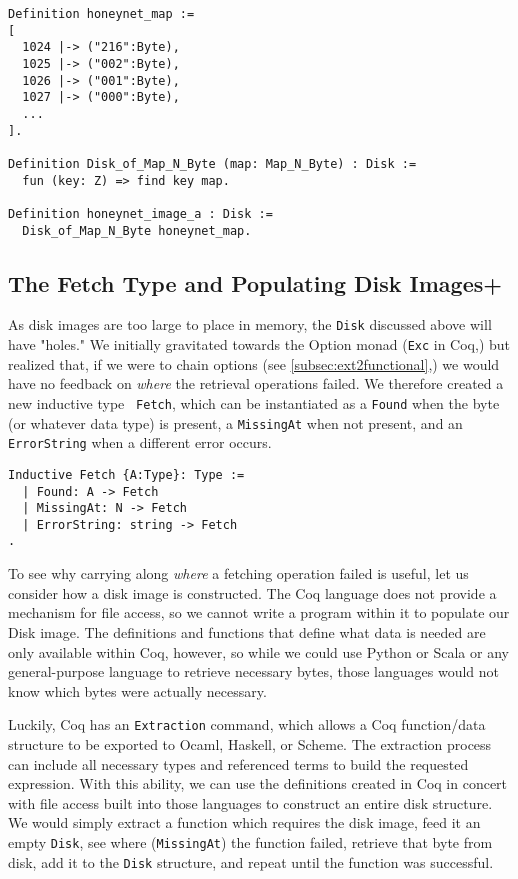 \documentclass[nocopyrightspace]{sigplanconf}
\begin{document}
\begin{lstlisting}
Definition honeynet_map := 
[ 
  1024 |-> ("216":Byte), 
  1025 |-> ("002":Byte),
  1026 |-> ("001":Byte), 
  1027 |-> ("000":Byte), 
  ...
].

Definition Disk_of_Map_N_Byte (map: Map_N_Byte) : Disk :=
  fun (key: Z) => find key map.

Definition honeynet_image_a : Disk := 
  Disk_of_Map_N_Byte honeynet_map.
\end{lstlisting}

\subsection{The Fetch Type and Populating Disk Images+}
\label{subsec:fetch}

As disk images are too large to place in memory, the {\tt Disk} discussed
above will have "holes." We initially gravitated towards the Option monad
({\tt Exc} in Coq,) but realized that, if we were to chain options (see
\ref{subsec:ext2functional},) we would have no feedback on {\em where} the
retrieval operations failed. We therefore created a new inductive type {\tt
Fetch}, which can be instantiated as a {\tt Found} when the byte (or whatever
data type) is present, a {\tt MissingAt} when not present, and an {\tt
ErrorString} when a different error occurs.

\begin{lstlisting}
Inductive Fetch {A:Type}: Type :=
  | Found: A -> Fetch
  | MissingAt: N -> Fetch
  | ErrorString: string -> Fetch
.
\end{lstlisting}

To see why carrying along {\em where} a fetching operation failed is useful,
let us consider how a disk image is constructed. The Coq language does not
provide a mechanism for file access, so we cannot write a program within it to
populate our Disk image. The definitions and functions that define what data
is needed are only available within Coq, however, so while we could use Python
or Scala or any general-purpose language to retrieve necessary bytes, those
languages would not know which bytes were actually necessary.

Luckily, Coq has an {\tt Extraction} command, which allows a Coq function/data
structure to be exported to Ocaml, Haskell, or Scheme. The extraction process
can include all necessary types and referenced terms to build the requested
expression. With this ability, we can use the definitions created in Coq in
concert with file access built into those languages to construct an entire
disk structure. We would simply extract a function which requires the disk
image, feed it an empty {\tt Disk}, see where ({\tt MissingAt}) the function
failed, retrieve that byte from disk, add it to the {\tt Disk} structure, and
repeat until the function was successful.
\end{document}
